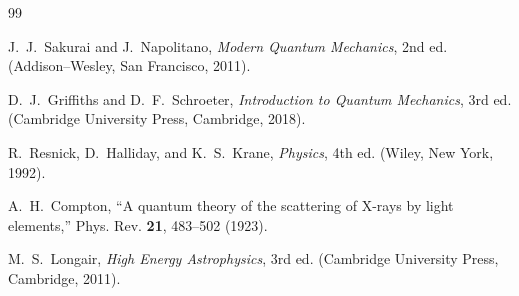 \documentclass[aps,prper,twocolumn,superscriptaddress]{revtex4-2}
\begin{document}
\begin{thebibliography}{99}

J.~J.~Sakurai and J.~Napolitano,
\textit{Modern Quantum Mechanics}, 2nd ed.
(Addison--Wesley, San Francisco, 2011).

D.~J.~Griffiths and D.~F.~Schroeter,
\textit{Introduction to Quantum Mechanics}, 3rd ed.
(Cambridge University Press, Cambridge, 2018).

R.~Resnick, D.~Halliday, and K.~S.~Krane,
\textit{Physics}, 4th ed.
(Wiley, New York, 1992).

A.~H.~Compton,
``A quantum theory of the scattering of X-rays by light elements,''
Phys. Rev. \textbf{21}, 483--502 (1923).

M.~S.~Longair,
\textit{High Energy Astrophysics}, 3rd ed.
(Cambridge University Press, Cambridge, 2011).

\end{thebibliography}
\end{document}
